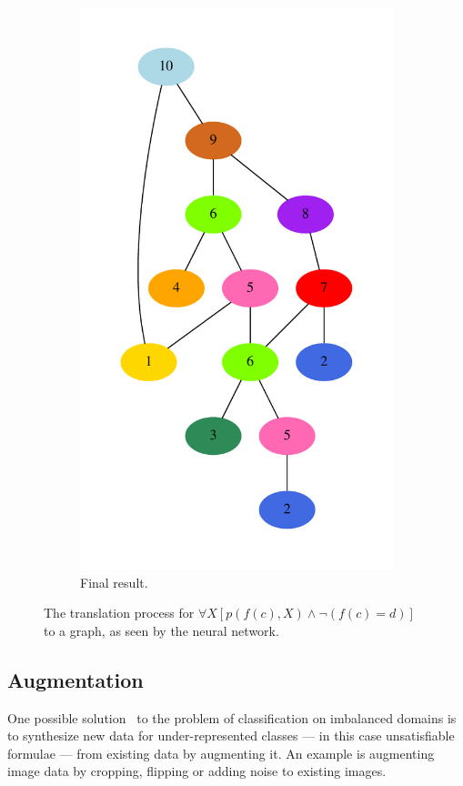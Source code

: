 \documentclass[runningheads]{llncs}
\begin{document}
\begin{figure}
\begin{subfigure}{.35\textwidth}
		\includegraphics[width=\linewidth]{translation-undirected}
		\caption{Final result.}
	\end{subfigure}
	\caption{The translation process for \(\forall X \left[p\left(f(c), X\right) \wedge \lnot\left(f(c) = d\right)\right]\) to a graph, as seen by the neural network.}
	\label{figure:translation}
\end{figure}

\subsection{Augmentation}
\label{section:augmentation}
One possible solution~\cite{imbalanced} to the problem of classification on imbalanced domains is to synthesize new data for under-represented classes --- in this case unsatisfiable formulae --- from existing data by augmenting it.
An example is augmenting image data by cropping, flipping or adding noise to existing images.
\end{document}
